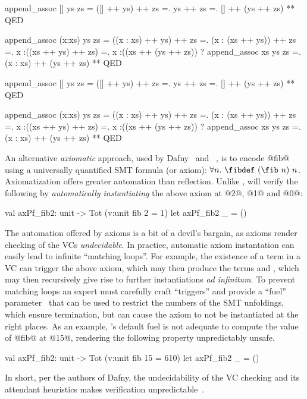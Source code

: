 append_assoc [] ys zs
  = ([] ++ ys) ++ zs
  =. ys ++ zs
  =. [] ++ (ys ++ zs)
  ** QED

append_assoc (x:xs) ys zs
  = ((x : xs) ++  ys)  ++ zs
  =. (x : (xs ++  ys)) ++ zs
  =.  x :((xs ++  ys)  ++ zs)
  =.  x :((xs ++ (ys   ++ zs)) ? append_assoc xs ys zs
  =. (x : xs) ++ (ys   ++ zs)
  ** QED


append_assoc [] ys zs
  = ([] ++ ys) ++ zs
  =. ys ++ zs
  =. [] ++ (ys ++ zs)
  ** QED

append_assoc (x:xs) ys zs
  = ((x : xs) ++  ys)  ++ zs
  =. (x : (xs ++  ys)) ++ zs
  =.  x :((xs ++  ys)  ++ zs)
  =.  x :((xs ++ (ys   ++ zs)) ? append_assoc xs ys zs
  =. (x : xs) ++ (ys   ++ zs)
  ** QED


%
An alternative \emph{axiomatic} approach,
used by Dafny~\citep{dafny} and
\fstar~\citep{fstar},
is to encode @fib@ using a universally
quantified SMT formula (or axiom):
$\forall n.\ \fibdef\ (\fib\ n)\ n$.
%
Axiomatization offers greater automation than
reflection. Unlike \toolname, \fstar
will verify the following by
\emph{automatically instantiating} the above
axiom at @2@, @1@ and @0@:
%
\begin{code}
   val axPf_fib2: unit -> Tot (v:unit {fib 2 = 1})
   let axPf_fib2 _ =  ()
\end{code}
%
The automation offered by axioms is a bit of a
devil's bargain, as axioms render checking of
the VCs \emph{undecidable}.
%
In practice, automatic axiom instantation can
easily lead to infinite ``matching loops''.
%
For example, the existence of a term  in a VC
can trigger the above axiom, which may then produce
the terms  and , which may then
recursively give rise to further instantiations
\emph{ad infinitum}.
%
To prevent matching loops an expert must carefully
craft ``triggers'' and provide a ``fuel''
parameter~\citep{Amin2014ComputingWA} that can be
used to restrict the numbers of the SMT unfoldings,
which ensure termination, but can cause the axiom
to not be instantiated at the right places.
%
As an example, \fstar's default fuel is not adequate
to compute the value of @fib@ at @15@,
rendering the following property unpredictably unsafe.
%
\begin{code}
   val axPf_fib2: unit -> Tot (v:unit {fib 15 = 610})
   let axPf_fib2 _ =  ()
\end{code}
%
In short, per the authors of Dafny, the
undecidability of the VC checking and its
attendant heuristics makes verification
unpredictable~\citep{Leino16}.




